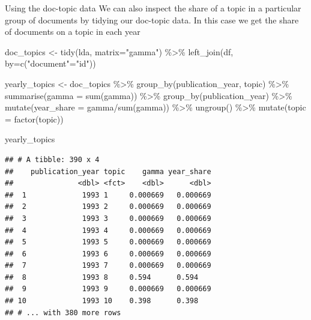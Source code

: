 \documentclass[
  10pt,
  ignorenonframetext,
  aspectratio=169]{beamer}
\newenvironment{Shaded}{\begin{snugshade}}{\end{snugshade}}
\newcommand{\AttributeTok}[1]{\textcolor[rgb]{0.80,0.80,0.80}{#1}}
\newcommand{\FunctionTok}[1]{\textcolor[rgb]{0.94,0.94,0.56}{#1}}
\newcommand{\NormalTok}[1]{\textcolor[rgb]{0.80,0.80,0.80}{#1}}
\newcommand{\OtherTok}[1]{\textcolor[rgb]{0.94,0.94,0.56}{#1}}
\newcommand{\SpecialCharTok}[1]{\textcolor[rgb]{0.86,0.64,0.64}{#1}}
\newcommand{\StringTok}[1]{\textcolor[rgb]{0.80,0.58,0.58}{#1}}
\begin{document}
\begin{frame}[fragile]{Using the doc-topic data}
\protect\hypertarget{using-the-doc-topic-data}{}
We can also inspect the share of a topic in a particular group of
documents by tidying our doc-topic data. In this case we get the share
of documents on a topic in each year

\medskip
\scriptsize

\begin{Shaded}
\begin{Highlighting}[]
\NormalTok{doc\_topics }\OtherTok{\textless{}{-}} \FunctionTok{tidy}\NormalTok{(lda, }\AttributeTok{matrix=}\StringTok{"gamma"}\NormalTok{) }\SpecialCharTok{\%\textgreater{}\%}
  \FunctionTok{left\_join}\NormalTok{(df, }\AttributeTok{by=}\FunctionTok{c}\NormalTok{(}\StringTok{"document"}\OtherTok{=}\StringTok{"id"}\NormalTok{))}

\NormalTok{yearly\_topics }\OtherTok{\textless{}{-}}\NormalTok{ doc\_topics }\SpecialCharTok{\%\textgreater{}\%} 
  \FunctionTok{group\_by}\NormalTok{(publication\_year, topic) }\SpecialCharTok{\%\textgreater{}\%}
  \FunctionTok{summarise}\NormalTok{(}\AttributeTok{gamma =} \FunctionTok{sum}\NormalTok{(gamma)) }\SpecialCharTok{\%\textgreater{}\%}
  \FunctionTok{group\_by}\NormalTok{(publication\_year) }\SpecialCharTok{\%\textgreater{}\%}
  \FunctionTok{mutate}\NormalTok{(}\AttributeTok{year\_share =}\NormalTok{ gamma}\SpecialCharTok{/}\FunctionTok{sum}\NormalTok{(gamma)) }\SpecialCharTok{\%\textgreater{}\%}
  \FunctionTok{ungroup}\NormalTok{() }\SpecialCharTok{\%\textgreater{}\%}
  \FunctionTok{mutate}\NormalTok{(}\AttributeTok{topic =} \FunctionTok{factor}\NormalTok{(topic))}

\NormalTok{yearly\_topics}
\end{Highlighting}
\end{Shaded}

\begin{verbatim}
## # A tibble: 390 x 4
##    publication_year topic    gamma year_share
##               <dbl> <fct>    <dbl>      <dbl>
##  1             1993 1     0.000669   0.000669
##  2             1993 2     0.000669   0.000669
##  3             1993 3     0.000669   0.000669
##  4             1993 4     0.000669   0.000669
##  5             1993 5     0.000669   0.000669
##  6             1993 6     0.000669   0.000669
##  7             1993 7     0.000669   0.000669
##  8             1993 8     0.594      0.594   
##  9             1993 9     0.000669   0.000669
## 10             1993 10    0.398      0.398   
## # ... with 380 more rows
\end{verbatim}
\end{frame}
\end{document}
